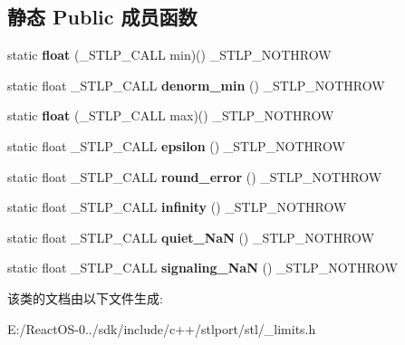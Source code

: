 \subsection*{静态 Public 成员函数}
\begin{DoxyCompactItemize}
\item 
\mbox{\label{classnumeric__limits_3_01float_01_4_ab47c8751b9550c71a7112587c1dcf5b2}} 
static {\bfseries float} (\+\_\+\+S\+T\+L\+P\+\_\+\+C\+A\+LL min)() \+\_\+\+S\+T\+L\+P\+\_\+\+N\+O\+T\+H\+R\+OW
\item 
\mbox{\label{classnumeric__limits_3_01float_01_4_aa1e62bbd1f99737b75a427b895faf464}} 
static float \+\_\+\+S\+T\+L\+P\+\_\+\+C\+A\+LL {\bfseries denorm\+\_\+min} () \+\_\+\+S\+T\+L\+P\+\_\+\+N\+O\+T\+H\+R\+OW
\item 
\mbox{\label{classnumeric__limits_3_01float_01_4_ace5240b990deff614283e09409d5904e}} 
static {\bfseries float} (\+\_\+\+S\+T\+L\+P\+\_\+\+C\+A\+LL max)() \+\_\+\+S\+T\+L\+P\+\_\+\+N\+O\+T\+H\+R\+OW
\item 
\mbox{\label{classnumeric__limits_3_01float_01_4_a9fcaa3e0e9ce6d321c1aae4b02cdf7d6}} 
static float \+\_\+\+S\+T\+L\+P\+\_\+\+C\+A\+LL {\bfseries epsilon} () \+\_\+\+S\+T\+L\+P\+\_\+\+N\+O\+T\+H\+R\+OW
\item 
\mbox{\label{classnumeric__limits_3_01float_01_4_ae6c68562511ece331a652548fcdaba0c}} 
static float \+\_\+\+S\+T\+L\+P\+\_\+\+C\+A\+LL {\bfseries round\+\_\+error} () \+\_\+\+S\+T\+L\+P\+\_\+\+N\+O\+T\+H\+R\+OW
\item 
\mbox{\label{classnumeric__limits_3_01float_01_4_ab2ee3ef80eaca6d7c5d9919326c317df}} 
static float \+\_\+\+S\+T\+L\+P\+\_\+\+C\+A\+LL {\bfseries infinity} () \+\_\+\+S\+T\+L\+P\+\_\+\+N\+O\+T\+H\+R\+OW
\item 
\mbox{\label{classnumeric__limits_3_01float_01_4_af6f43edce5ff072a1bee2314a923eeba}} 
static float \+\_\+\+S\+T\+L\+P\+\_\+\+C\+A\+LL {\bfseries quiet\+\_\+\+NaN} () \+\_\+\+S\+T\+L\+P\+\_\+\+N\+O\+T\+H\+R\+OW
\item 
\mbox{\label{classnumeric__limits_3_01float_01_4_a3d19418ff40137baa6bd712d046aee19}} 
static float \+\_\+\+S\+T\+L\+P\+\_\+\+C\+A\+LL {\bfseries signaling\+\_\+\+NaN} () \+\_\+\+S\+T\+L\+P\+\_\+\+N\+O\+T\+H\+R\+OW
\end{DoxyCompactItemize}


该类的文档由以下文件生成\+:\begin{DoxyCompactItemize}
\item 
E\+:/\+React\+O\+S-\/0../sdk/include/c++/stlport/stl/\+\_\+limits.\+h\end{DoxyCompactItemize}

